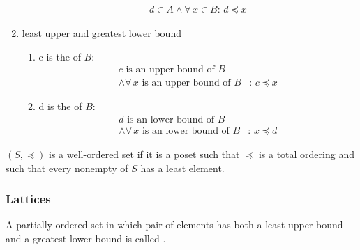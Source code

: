 \begin{definition}
\begin{enumerate}
\begin{enumerate}
\begin{align*}
                d\in A \land \forall\, x \in B:\, d\preceq x
            \end{align*}
        \end{enumerate}
        \item least upper and greatest lower bound
        \begin{enumerate}
            \item c is the  of $B$:
            \begin{align*}
                c\text{ is an upper bound of }B&\\ \land \forall\, x \text{ is an upper bound of }B&:\, c\preceq x
            \end{align*}
            \item d is the  of $B$: 
            \begin{align*}
                d\text{ is an lower bound of }B&\\ \land \forall\, x \text{ is an lower bound of }B&:\, x\preceq d
            \end{align*}
        \end{enumerate}
    \end{enumerate}
    $(S,\preceq)$ is a well-ordered set if it is a poset such that $\preceq$ is a total ordering and such that every nonempty of $S$ has a least element. 
\end{definition}

\subsubsection{Lattices}
\begin{definition}
    A partially ordered set in which pair of elements has both a least upper bound and a greatest lower bound is called .
\end{definition}